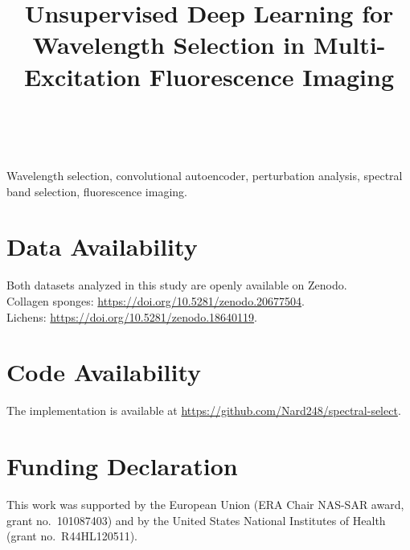 \documentclass[journal]{IEEEtran}
\begin{document}
\title{Unsupervised Deep Learning for Wavelength Selection in Multi-Excitation Fluorescence Imaging}

\author{
\\
}

\maketitle
\linenumbers



\begin{IEEEkeywords}
Wavelength selection, convolutional autoencoder, perturbation analysis, spectral band selection, fluorescence imaging.
\end{IEEEkeywords}









\section*{Data Availability}
Both datasets analyzed in this study are openly available on Zenodo. 
\\ 
Collagen sponges: \url{https://doi.org/10.5281/zenodo.20677504}. 
\\
Lichens: \url{https://doi.org/10.5281/zenodo.18640119}.

\section*{Code Availability}
The implementation is available at \url{https://github.com/Nard248/spectral-select}.

\section*{Funding Declaration}
This work was supported by the European Union (ERA Chair NAS-SAR award, grant no.\ 101087403) and by the United States National Institutes of Health (grant no.\ R44HL120511).
\end{document}
